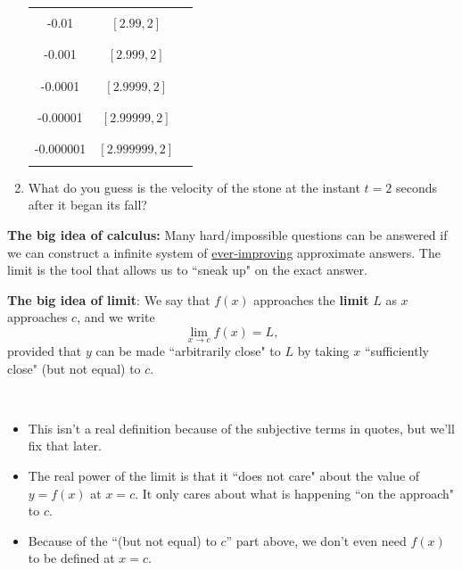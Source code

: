 \begin{enumerate}
\begin{table}[H]
\begin{tabular}{|c|c|c|}
\hline
&&\\
-0.01 &$[2.99,2]$& \\
&&\\
\hline
&&\\
-0.001 &$[2.999,2]$& \\
&&\\
\hline
&&\\
-0.0001 &$[2.9999,2]$& \\
&&\\
\hline
&&\\
-0.00001 &$[2.99999,2]$& \\
&&\\
\hline
&&\\
-0.000001 &$[2.999999,2]$& \\
&&\\
\hline
\end{tabular}
\end{table}
\vfill
\item What do you guess is the velocity of the stone at the instant $t=2$ seconds after it began its fall?
\vfill
\end{enumerate}


\newpage

\begin{mdframed}
\textbf{The big idea of calculus:} Many hard/impossible questions can be answered if we can construct a infinite system of \underline{ever-improving} approximate answers.
The limit is the tool that allows us to ``sneak up" on the exact answer.
\end{mdframed}
\vspace{12pt}
\begin{mdframed}
\textbf{The big idea of limit}:
We say that $f(x)$ approaches the \textbf{limit} $L$ as $x$ approaches $c$, and we write
\begin{equation*}
\lim_{x\to c}f(x) = L,
\end{equation*}
provided that $y$ can be made ``arbitrarily close" to $L$ by taking $x$ ``sufficiently close" (but not equal) to $c$.
\end{mdframed}

\begin{remark}\,
\begin{itemize}
\item This isn't a real definition because of the subjective terms in quotes, but we'll fix that later.
\item The real power of the limit is that it ``does not care" about the value of $y=f(x)$ at $x=c$.
It only cares about what is happening ``on the approach" to $c$.
\item Because of the ``(but not equal) to $c$'' part above, we don't even need $f(x)$ to be defined at $x=c$.
\end{itemize}
\end{remark}
\vfill

